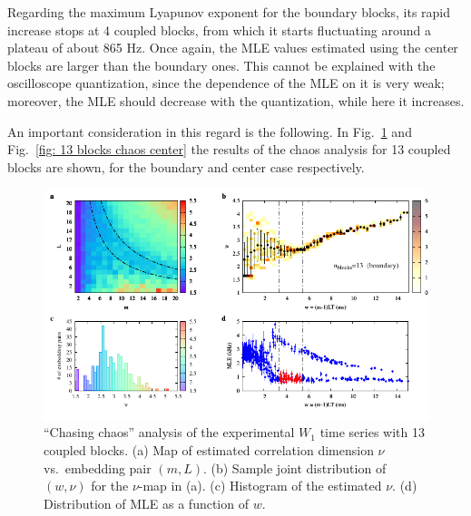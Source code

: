 Regarding the maximum Lyapunov exponent for the boundary blocks, its rapid increase stops at 4 coupled
blocks, from which it starts fluctuating around a plateau of about 865 Hz.
Once again, the MLE values estimated using the center blocks are larger than the boundary ones.
This cannot be explained with the oscilloscope quantization, since the dependence of the MLE on
it is very weak; moreover, the MLE should decrease with the quantization, while here it increases.

An important consideration in this regard is the following. In Fig.~\ref{fig: 13 blocks chaos boundary}
and Fig.~\ref{fig: 13 blocks chaos center}
the results of the chaos analysis for 13 coupled blocks are shown, for the boundary and center case
respectively.

\begin{figure}[ht!]
    \centering
    \includegraphics[width=\linewidth]{../blocks/13_blocks/edge/2e5_points/plots/chaos_low.pdf}
    \caption{``Chasing chaos'' analysis of the experimental $W_1$ time series with 13 coupled blocks.
    (a) Map of estimated correlation dimension $\nu$ vs.\ embedding pair $(m, L)$.
    (b) Sample joint distribution of $(w,\nu)$ for the $\nu$-map in (a).
    (c) Histogram of the estimated $\nu$. (d) Distribution of MLE as a function of $w$.
    }\label{fig: 13 blocks chaos boundary}
\end{figure}

